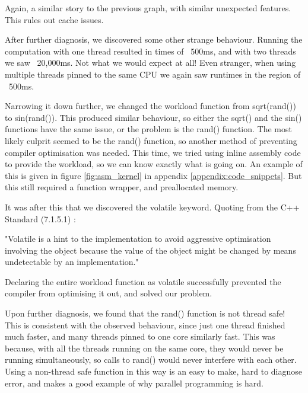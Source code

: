 Again, a similar story to the previous graph, with similar unexpected features. This rules out cache issues. 

After further diagnosis, we discovered some other strange behaviour. Running the computation with one thread resulted in times of ~500ms, and with two threads we saw ~20,000ms. Not what we would expect at all! Even stranger, when using multiple threads pinned to the same CPU we again saw runtimes in the region of ~500ms. 

Narrowing it down further, we changed the workload function from sqrt(rand()) to sin(rand()). This produced similar behaviour, so either the sqrt() and the sin() functions have the same issue, or the problem is the rand() function. The most likely culprit seemed to be the rand() function, so another method of preventing compiler optimisation was needed. This time, we tried using inline assembly code to provide the workload, so we can know exactly what is going on. An example of this is given in figure \ref{fig:asm_kernel} in appendix \ref{appendix:code_snippets}. But this still required a function wrapper, and preallocated memory.

It was after this that we discovered the volatile keyword. Quoting from the C++ Standard (7.1.5.1) \cite{cpp_standard}:

"Volatile is a hint to the implementation to avoid aggressive optimisation involving the object because the value of the object might be changed by means undetectable by an implementation."

Declaring the entire workload function as volatile successfully prevented the compiler from optimising it out, and solved our problem.

Upon further diagnosis, we found that the rand() function is not thread safe! This is consistent with the observed behaviour, since just one thread finished much faster, and many threads pinned to one core similarly fast. This was because, with all the threads running on the same core, they would never be running simultaneously, so calls to rand() would never interfere with each other. Using a non-thread safe function in this way is an easy to make, hard to diagnose error, and makes a good example of why parallel programming is hard.